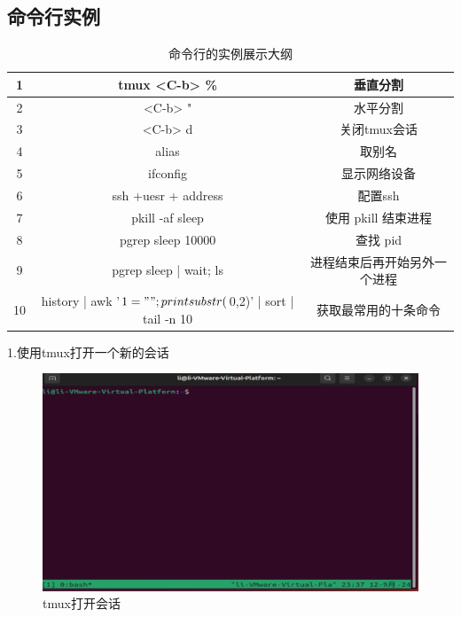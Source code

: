 \documentclass[a4paper, 12pt]{article}
\begin{document}
\subsection{\color{green}命令行实例}
\begin{table}[H]
\centering
\caption{\color{red}命令行的实例展示大纲}
\begin{tabular}{ccc} 
\toprule

 1&    tmux <C-b> \%         &  垂直分割                      \\ 
\hline
 2&<C-b> "   & 水平分割  \\ 
\hline
 3&<C-b> d  &   关闭tmux会话\\ 
\hline
 4& alias & 取别名  \\ 
\hline
 5&ifconfig & 显示网络设备  \\ 
\hline
 6& ssh +uesr + address&  配置ssh\\
 \hline

 7& pkill  -af sleep &   使用 pkill 结束进程\\
 \hline
8 &pgrep sleep 10000 &   查找 pid \\
 \hline
9 &pgrep sleep | wait; ls &   进程结束后再开始另外一个进程\\
 \hline
 10 & history | awk '{$1="";print substr($0,2)}' | sort | tail -n 10 &   获取最常用的十条命令\\
\bottomrule
\end{tabular}
\end{table}


1.使用tmux打开一个新的会话
\begin{figure}[H]
  \centering
  \includegraphics[width=\textwidth]{屏幕截图 2024-09-12 233752.png}
  \caption{tmux打开会话}
\end{figure}
\end{document}
